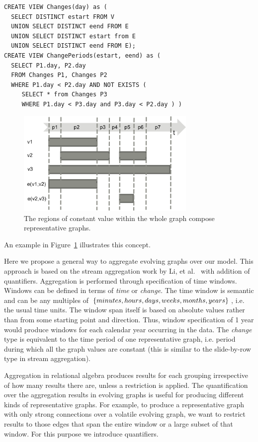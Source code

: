 \begin{small}
\begin{verbatim}
CREATE VIEW Changes(day) as (
  SELECT DISTINCT estart FROM V
  UNION SELECT DISTINCT eend FROM E
  UNION SELECT DISTINCT estart from E
  UNION SELECT DISTINCT eend FROM E);
CREATE VIEW ChangePeriods(estart, eend) as (
  SELECT P1.day, P2.day
  FROM Changes P1, Changes P2
  WHERE P1.day < P2.day AND NOT EXISTS (
     SELECT * from Changes P3
     WHERE P1.day < P3.day and P3.day < P2.day ) )
\end{verbatim}
\end{small}

\begin{figure}
\centering
\includegraphics[width=3.4in]{figs/change_timeline.pdf}
\caption{The regions of constant value within the whole graph compose
  representative graphs.}
\label{fig:changes}
\end{figure}

An example in Figure~\ref{fig:changes} illustrates this concept.

Here we propose a general way to aggregate evolving graphs over our
model.  This approach is based on the stream aggregation work by Li,
et al.~\cite{Li2005} with addition of quantifiers.  Aggregation is
performed through specification of time windows.  Windows can be
defined in terms of {\em time} or {\em change}.  The time window is
semantic and can be any multiples of $\{minutes, hours, days, weeks,
\\ months, years\}$, i.e. the usual time units.  The window span
itself is based on absolute values rather than from some starting
point and direction.  Thus, window specification of 1 year would
produce windows for each calendar year occurring in the data.  The
{\em change} type is equivalent to the time period of one
representative graph, i.e. period during which all the graph values
are constant (this is similar to the slide-by-row type in stream
aggregation).

Aggregation in relational algebra produces results for each grouping
irrespective of how many results there are, unless a 
restriction is applied.  The quantification over the aggregation
results in evolving graphs is useful for producing different kinds of
representative graphs.  For example, to produce a representative graph
with only strong connections over a volatile evolving graph, we want
to restrict results to those edges that span the entire window or a
large subset of that window.  For this purpose we introduce
quantifiers.

